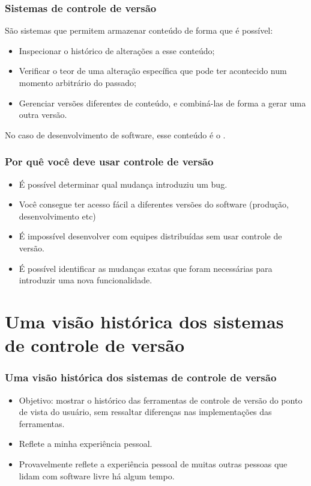 \documentclass{beamer}
\begin{document}
\begin{frame}
  \frametitle{Sistemas de controle de versão}

  São sistemas que permitem armazenar conteúdo de forma que é possível:
  \pause

  \begin{itemize}
    \item Inspecionar o histórico de alterações a esse conteúdo;
      \pause
    \item Verificar o teor de uma alteração específica que pode ter
      acontecido num momento arbitrário do passado;
      \pause
    \item Gerenciar versões diferentes de conteúdo, e combiná-las de
      forma a gerar uma outra versão.
  \end{itemize}

  \pause
  No caso de desenvolvimento de software, esse conteúdo é o
  .

\end{frame}

\begin{frame}
  \frametitle{Por quê você deve usar controle de versão}
  
  \begin{itemize}
      \pause
    \item É possível determinar qual mudança introduziu um bug.
      \pause
    \item Você consegue ter acesso fácil a diferentes versões do software (produção,
      desenvolvimento etc)
      \pause
    \item É impossível desenvolver com equipes distribuídas sem usar
      controle de versão.
      \pause
    \item É possível identificar as mudanças exatas que foram necessárias
      para introduzir uma nova funcionalidade.
  \end{itemize}
\end{frame}

\section[Histórico]{Uma visão histórica dos sistemas de controle de versão}

\begin{frame}
  \frametitle{Uma visão histórica dos sistemas de controle de versão}

  \pause
  \begin{itemize}
    \item Objetivo: mostrar o histórico das ferramentas de controle de
      versão do ponto de vista do usuário, sem ressaltar diferenças nas
      implementações das ferramentas.
      \pause
    \item Reflete a minha experiência pessoal.
      \pause
    \item Provavelmente reflete a experiência pessoal de muitas outras
      pessoas que lidam com software livre há algum tempo.
  \end{itemize}
\end{frame}
\end{document}
